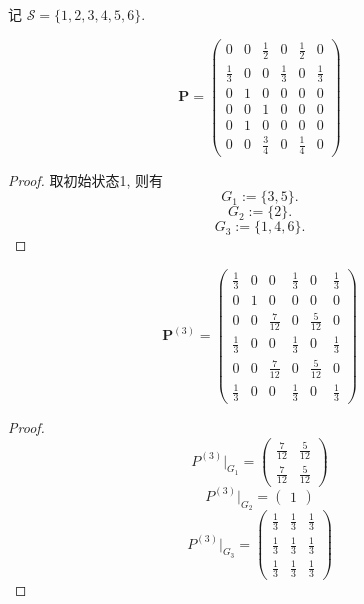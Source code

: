 \documentclass[lang=cn,10pt,thmcnt=section]{elegantbook}
\begin{document}
	\begin{example}
		记 $\mathcal{S} = \{1, 2, 3, 4, 5, 6\}$.

\[
\mathbf{P} = \begin{pmatrix}
0 & 0 & \frac{1}{2} & 0 & \frac{1}{2} & 0 \\
\frac{1}{3} & 0 & 0 & \frac{1}{3} & 0 & \frac{1}{3} \\
0 & 1 & 0 & 0 & 0 & 0 \\
0 & 0 & 1 & 0 & 0 & 0 \\
0 & 1 & 0 & 0 & 0 & 0 \\
0 & 0 & \frac{3}{4} & 0 & \frac{1}{4} & 0
\end{pmatrix}
\]
	\end{example}
	\begin{proof}
		取初始状态1, 则有
\[
G_1 := \{3, 5\}.
\]
\[
G_2 := \{2\}.
\]
\[
G_3 := \{1, 4, 6\}.
\]


	\end{proof}


\begin{example}
	\[
\mathbf{P}^{(3)} = \begin{pmatrix}
\frac{1}{3} & 0 & 0 & \frac{1}{3} & 0 & \frac{1}{3} \\
0 & 1 & 0 & 0 & 0 & 0 \\
0 & 0 & \frac{7}{12} & 0 & \frac{5}{12} & 0 \\
\frac{1}{3} & 0 & 0 & \frac{1}{3} & 0 & \frac{1}{3} \\
0 & 0 & \frac{7}{12} & 0 & \frac{5}{12} & 0 \\
\frac{1}{3} & 0 & 0 & \frac{1}{3} & 0 & \frac{1}{3}
\end{pmatrix}
\]
\end{example}

\begin{proof}
	\[
P^{(3)}|_{G_1} = \begin{pmatrix}
\frac{7}{12} & \frac{5}{12} \\
\frac{7}{12} & \frac{5}{12}
\end{pmatrix}
\]
\[
P^{(3)}|_{G_2} = \begin{pmatrix}
1
\end{pmatrix}
\]
\[
P^{(3)}|_{G_3} = \begin{pmatrix}
\frac{1}{3} & \frac{1}{3} & \frac{1}{3} \\
\frac{1}{3} & \frac{1}{3} & \frac{1}{3} \\
\frac{1}{3} & \frac{1}{3} & \frac{1}{3}
\end{pmatrix}
\]
\end{proof}
\end{document}
